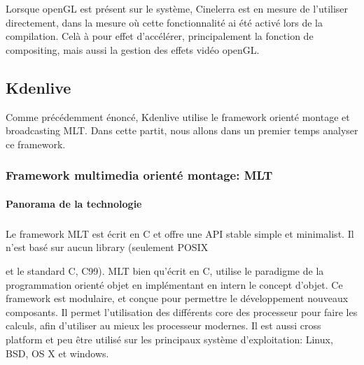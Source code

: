 Lorsque openGL est présent sur le système, Cinelerra
est en mesure de l'utiliser directement, dans la mesure où cette
fonctionnalité ai été activé lors de la compilation. Celà à pour
effet d'accélérer, principalement la fonction de compositing, mais
aussi la gestion des effets vidéo openGL.





\subsection {Kdenlive}

Comme précédemment énoncé, Kdenlive utilise le framework orienté
montage et broadcasting MLT. Dans cette partit, nous allons dans un
premier temps analyser ce framework.

\subsubsection {Framework multimedia orienté montage: MLT}

\paragraph {Panorama de la technologie} %

\subparagraph{}

Le framework MLT est écrit en C et offre une API stable
simple et minimalist. Il n'est basé sur aucun library (seulement POSIX

 et le standard C, C99). MLT bien
qu'écrit en C, utilise le paradigme de la programmation orienté objet en
implémentant en intern le concept d'objet. Ce framework est modulaire,
et conçue pour permettre le développement nouveaux composants. Il
permet l'utilisation des différents core des processeur pour faire
les calculs, afin d'utiliser au mieux les processeur modernes. Il est
aussi cross platform et peu être utilisé sur les principaux système
d'exploitation: Linux, BSD, OS X et windows.

